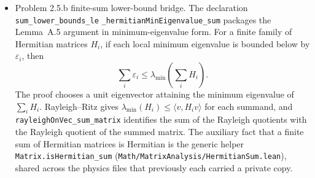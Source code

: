 \documentclass[a4paper,11pt]{article}
\begin{document}
\begin{itemize}
        \texttt{singleCluster\_compl\_leaf\_bool\_card}; the leaf-Casimir
        equation is obtained by rewriting the sublattice equation with
        \texttt{leafSpinSSquared\_eq\_sublatticeSpinSquaredS\_leaf}.
        Feeding this existential package into
        \texttt{singleClusterHamiltonianS\_minEigenvalue\_eq\_gs\_of}
        \texttt{\_exists\_gs\_sector\_and\_extracted\_coupled}
        gives
        \texttt{singleClusterHamiltonianS\_minEigenvalue\_eq\_gs\_of}
        \texttt{\_predicted\_joint\_witness}:
        for \(1\le z\),
        \[
          \lambda_{\min}(\hat H)
          =
          \operatorname{Re}E_{\rm GS}
        \]
        under the explicit hypothesis
        \texttt{[IsAlgClosed \(\mathbb C\)]}
        ($\gamma$-5 step 338).
  \item Problem 2.5.b finite-sum lower-bound bridge.  The declaration
        \texttt{sum\_lower\_bounds\_le}
        \texttt{\_hermitianMinEigenvalue\_sum}
        packages the Lemma~A.5 argument in minimum-eigenvalue form.  For a
        finite family of Hermitian matrices \(H_i\), if each local minimum
        eigenvalue is bounded below by \(\varepsilon_i\), then
        \[
          \sum_i \varepsilon_i
          \le
          \lambda_{\min}\!\left(\sum_i H_i\right).
        \]
        The proof chooses a unit eigenvector attaining the minimum eigenvalue
        of \(\sum_i H_i\).  Rayleigh--Ritz gives
        \(\lambda_{\min}(H_i)\le\langle v,H_i v\rangle\) for each summand,
        and \texttt{rayleighOnVec\_sum\_matrix} identifies the sum of the
        Rayleigh quotients with the Rayleigh quotient of the summed matrix.
        The auxiliary fact that a finite sum of Hermitian matrices is
        Hermitian is the generic helper \texttt{Matrix.isHermitian\_sum}
        (\texttt{Math/MatrixAnalysis/HermitianSum.lean}), shared across the
        physics files that previously each carried a private copy.


\end{itemize}
\end{document}
